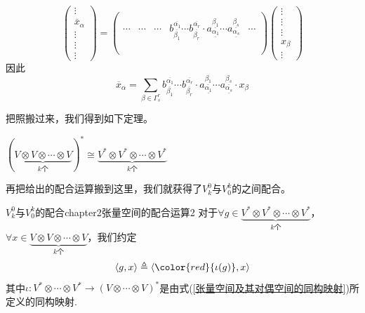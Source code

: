\[
\left( \begin{array}{ccccc}{\vdots} \\ {\overline{x}_{\alpha}}  \\ {\vdots} \\ {\vdots}\\ {\vdots}\end{array}\right)=\left( \begin{array}{ccccc}{ } & { } & { } & { }&{} \\ { \cdots} & {\cdots} & {\cdots} & { \boxed{b^{\overline{\alpha_{1}}}_{\overline{\beta_{ 1 }}}\cdots b^{\overline{\alpha_{r}}}_{\overline{\beta_{ r }}}\cdot a^{\underline{\beta_{ 1 }}}_{\underline{\alpha_{ 1 }}}\cdots a^{\underline{\beta_{ s }}}_{\underline{\alpha_{ s }}}}} &{\cdots}\\ { } & { } & { } & { } &{}\\ { } & { } & { } & { }&{}\\ { } & { } & { } & { }&{}\end{array}\right)\left( \begin{array}{ccccc}{\vdots} \\ {\vdots}  \\ {\vdots} \\ {\boxed{x_{\beta}}}\\ {\vdots}\end{array}\right)
\]
因此
\[
\overline{x}_{\alpha}=\sum_{ \beta\in \Gamma^{r}_{s} }\boxed{b^{\overline{\alpha_{1}}}_{\overline{\beta_{ 1 }}}\cdots b^{\overline{\alpha_{r}}}_{\overline{\beta_{ r }}}\cdot a^{\underline{\beta_{ 1 }}}_{\underline{\alpha_{ 1 }}}\cdots a^{\underline{\beta_{ s }}}_{\underline{\alpha_{ s }}}}\cdot \boxed{x_{\beta}}
\]

把照搬过来，我们得到如下定理。

\begin{mythm}{}{}
$(\underbrace{V\otimes V\otimes \cdots\otimes V}_{k\text{个}})^{\ast}\cong \underbrace{V^{\ast}\otimes V^{\ast}\otimes \cdots\otimes V^{\ast}}_{k\text{个}}  $
\end{mythm}

再把给出的配合运算搬到这里，我们就获得了$V^{0}_{k}$与$V^{k}_{0}$的之间配合。

\begin{mydef}{$V^{0}_{k}$与$V^{k}_{0}$的配合}{chapter2张量空间的配合运算2}
	对于$\forall g\in \underbrace{V^{\ast}\otimes V^{\ast}\otimes \cdots\otimes V^{\ast}}_{k\text{个}} $，$\forall x\in \underbrace{V\otimes V\otimes \cdots\otimes V}_{k\text{个}}$，我们约定
	\[
		\langle g,x\rangle\triangleq \langle{\color{red}{\iota(g)}},x\rangle
	\]
	其中$\iota:V^{\ast}\otimes \cdots\otimes V^{\ast}\longrightarrow (V\otimes \cdots\otimes V)^{\ast}$是由式(\ref{张量空间及其对偶空间的同构映射})所定义的同构映射.
\end{mydef}

